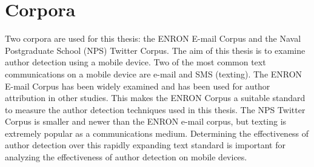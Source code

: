 \section{Corpora} Two corpora are used for this thesis: the ENRON E-mail Corpus and the Naval Postgraduate School (NPS) Twitter Corpus.  The aim of this thesis is to examine author detection using a mobile device.  Two of the most common text communications on a mobile device are e-mail and SMS (texting).  The ENRON E-mail Corpus has been widely examined and has been used for author attribution in other studies.  This makes the ENRON Corpus a suitable standard to measure the author detection techniques used in this thesis.  The NPS Twitter Corpus is smaller and newer than the ENRON e-mail corpus, but texting is extremely popular as a communications medium.  Determining the effectiveness of author detection over this rapidly expanding text standard is important for analyzing the effectiveness of author detection on mobile devices.
